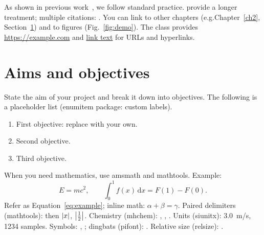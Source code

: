 As shown in previous work~\citep{example-paper}, we follow standard practice.
\citet{example-book} provide a longer treatment; multiple citations: \citep{example-paper,example-conf}. You can link to other chapters (e.g.\@ Chapter~\ref{ch2}, Section~\ref{sec:objectives}) and to figures (Fig.~\ref{fig:demo}). The class provides \url{https://example.com} and \href{https://example.com}{link text} for URLs and hyperlinks.


\section{Aims and objectives}\label{sec:objectives}

State the aim of your project and break it down into objectives. The following is a placeholder list (enumitem package: custom labels).

\cite{example-book}

\citep{example-book}

\citet{example-book}

\citep{internationalTrends}

\citet{scratchImpact}

\begin{enumerate}[label=\textbf{O\arabic*:}, leftmargin=*]
  \item First objective: replace with your own.
  \item Second objective.
  \item Third objective.
\end{enumerate}

When you need mathematics, use amsmath and mathtools. Example:
\begin{equation}\label{eq:example}
  E = mc^2, \qquad \int_0^1 f(x)\,\mathrm{d}x = F(1) - F(0).
\end{equation}
Refer as Equation~\eqref{eq:example}; inline math: $\alpha + \beta = \gamma$. Paired delimiters (mathtools): \DeclarePairedDelimiter{\abs}{\lvert}{\rvert} then $\abs{x}$, $\abs*{\frac{1}{2}}$. Chemistry (mhchem): , , . Units (siunitx): \SI{3.0}{m/s}, \num{1234} samples. Symbols: \textdegree, \textcopyright; dingbats (pifont):  . Relative size (relsize):  .

